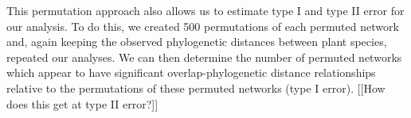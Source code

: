 \documentclass[12pt]{article}
\begin{document}
\begin{spacing}{1.5}
  This permutation approach also allows us to estimate type I and type II 
  error for our analysis. To do this, we created 500 permutations of each 
  permuted network and, again keeping the observed phylogenetic distances 
  between plant species, repeated our analyses. We can then determine the 
  number of permuted networks which appear to have significant 
  overlap-phylogenetic distance relationships relative to the permutations 
  of these permuted networks (type I error). [[How does this get at type II error?]] 







\end{spacing}
\end{document}
